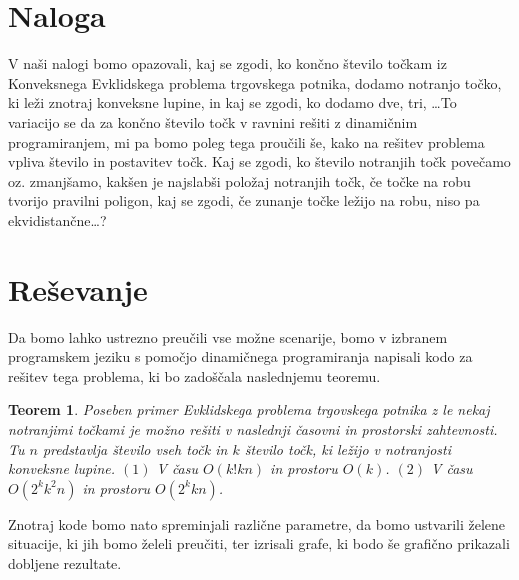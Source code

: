 \documentclass[a4paper, 11pt]{article}
\newtheorem*{teorem}{Teorem}
\begin{document}
\section*{Naloga}

V naši nalogi bomo opazovali, kaj se zgodi, ko končno število točkam iz Konveksnega Evklidskega problema trgovskega potnika, dodamo 
notranjo točko, ki leži znotraj konveksne lupine, in kaj se zgodi, ko dodamo dve, tri, \dots To variacijo se da za končno število točk 
v ravnini rešiti z dinamičnim programiranjem, mi pa bomo poleg tega proučili še, kako na rešitev problema vpliva število in postavitev 
točk. Kaj se zgodi, ko število notranjih točk povečamo oz. zmanjšamo, kakšen je najslabši položaj notranjih točk, če točke na robu 
tvorijo pravilni poligon, kaj se zgodi, če zunanje točke ležijo na robu, niso pa ekvidistančne\dots ?

\section*{Reševanje}

Da bomo lahko ustrezno preučili vse možne scenarije, bomo v izbranem programskem jeziku s pomočjo dinamičnega programiranja napisali 
kodo za rešitev tega problema, ki bo zadoščala naslednjemu teoremu.

\begin{teorem}
    Poseben primer Evklidskega problema trgovskega potnika z le nekaj notranjimi točkami je možno rešiti v naslednji časovni in prostorski 
    zahtevnosti. Tu $n$ predstavlja število vseh točk in $k$ število točk, ki ležijo v notranjosti konveksne lupine. $(1)$ V času $O(k!kn)$
    in prostoru $O(k)$. $(2)$ V času $O(2^kk^2n)$ in prostoru $O(2^kkn)$.
\end{teorem}

Znotraj kode bomo nato spreminjali različne parametre, da bomo ustvarili želene situacije, ki jih bomo želeli preučiti, ter izrisali grafe, 
ki bodo še grafično prikazali dobljene rezultate.
\end{document}
